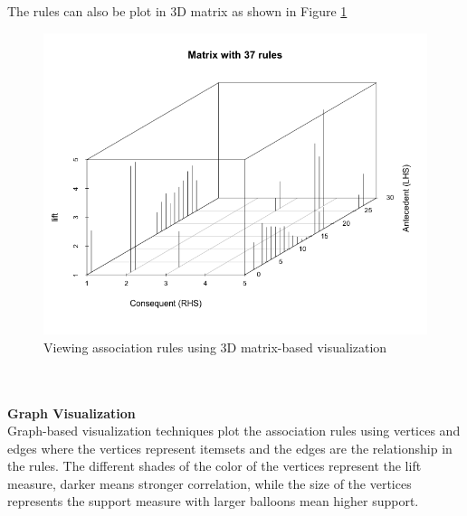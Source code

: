 \documentclass{article}
\begin{document}
The rules can also be plot in 3D matrix as shown in Figure \ref{fig:3Dmatrix}
\begin{figure}[h!]
  \centering
    \includegraphics[width=1.0\textwidth]{images/3Dmatrix}
    \caption{Viewing association rules using 3D matrix-based visualization}
    \label{fig:3Dmatrix}
\end{figure}
\\\\
\textbf{Graph Visualization}\\
Graph-based visualization techniques plot the association rules using vertices and edges where the vertices represent itemsets and the edges are the relationship in the rules.  The different shades of the color of the vertices represent the lift measure, darker means stronger correlation, while the size of the vertices represents the support measure with larger balloons mean higher support.  
\end{document}
